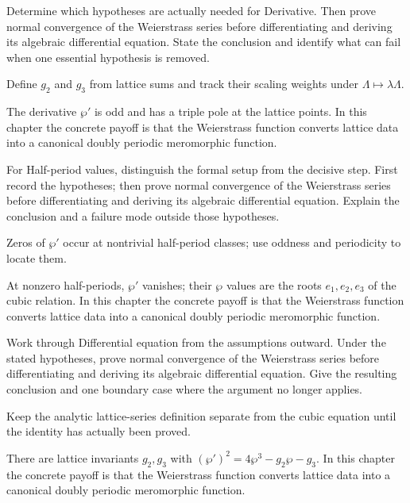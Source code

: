 \begin{exercise}\label{exr:iv29-06}
Determine which hypotheses are actually needed for Derivative. Then prove normal convergence of the Weierstrass series before differentiating and deriving its algebraic differential equation. State the conclusion and identify what can fail when one essential hypothesis is removed.
\end{exercise}
\begin{hint}
Define \(g_2\) and \(g_3\) from lattice sums and track their scaling weights under \(\Lambda\mapsto\lambda\Lambda\).
\end{hint}
\begin{solution}
The derivative $\wp'$ is odd and has a triple pole at the lattice points. In this chapter the concrete payoff is that the Weierstrass function converts lattice data into a canonical doubly periodic meromorphic function.
\end{solution}

\begin{exercise}\label{exr:iv29-07}
For Half-period values, distinguish the formal setup from the decisive step. First record the hypotheses; then prove normal convergence of the Weierstrass series before differentiating and deriving its algebraic differential equation. Explain the conclusion and a failure mode outside those hypotheses.
\end{exercise}
\begin{hint}
Zeros of \(\wp'\) occur at nontrivial half-period classes; use oddness and periodicity to locate them.
\end{hint}
\begin{solution}
At nonzero half-periods, $\wp'$ vanishes; their $\wp$ values are the roots $e_1,e_2,e_3$ of the cubic relation. In this chapter the concrete payoff is that the Weierstrass function converts lattice data into a canonical doubly periodic meromorphic function.
\end{solution}

\begin{exercise}\label{exr:iv29-08}
Work through Differential equation from the assumptions outward. Under the stated hypotheses, prove normal convergence of the Weierstrass series before differentiating and deriving its algebraic differential equation. Give the resulting conclusion and one boundary case where the argument no longer applies.
\end{exercise}
\begin{hint}
Keep the analytic lattice-series definition separate from the cubic equation until the identity has actually been proved.
\end{hint}
\begin{solution}
There are lattice invariants $g_2,g_3$ with $(\wp')^2=4\wp^3-g_2\wp-g_3$. In this chapter the concrete payoff is that the Weierstrass function converts lattice data into a canonical doubly periodic meromorphic function.
\end{solution}

